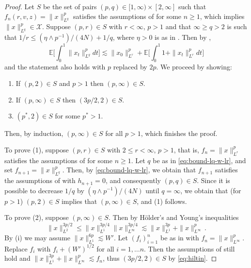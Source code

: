 \documentclass[final]{amsart}
\numberwithin{thm}{section}
\numberwithin{equation}{section}
\newcommand{\E}{\mathbb{E}}
\newcommand{\X}{\mathcal{X}}
\begin{document}
\begin{proof}

    Let $S$ be the set of pairs $(p,q) \in [1,\infty) \times [2,\infty]$ such that $f_n(r,v,z) = \|x\|_{L^q}^p$ satisfies the assumptions of  for some $n \geq 1$, which implies  $\|x\|_{L^q}^p \in \X$. 
    Suppose $(p,r) \in S$ with $r < \infty$, $p > 1$ and that $\infty \geq q > 2$ is such that $1/r \leq (\eta \wedge p^{-1})/(4N) + 1/q$, where $\eta>0$ is as in . Then by ,
     \begin{equation}\label{eq:bound-lq-w-lr}
         \E\Big[\int_0^1 \|x_t\|_{L^q}^pdt\Big] \lesssim \|x_0\|_{L^r}^p + \E\Big[\int_0^1 1+\|x_t\|_{L^r}^pdt\Big] 
     \end{equation}
and the statement also holds with $p$ replaced by $2p$.
We proceed by showing:
    \begin{enumerate}
        \item If $(p,2) \in S$ and $p > 1$ then $(p,\infty) \in S$.
        \item If $(p,\infty) \in S$ then $(3p/2,2) \in S$.
        \item $(p^*,2) \in S$ for some $p^* > 1$.
        
    \end{enumerate}
    Then, by induction, $(p,\infty) \in S$ for all $p > 1$, which finishes the proof. 

    To prove (1), suppose $(p,r) \in S$ with $2\leq r < \infty$, $p > 1$, that is, $f_n = \|x\|_{L^r}^p$ satisfies the assumptions of  for some $n \geq 1$. Let $q$ be as in \eqref{eq:bound-lq-w-lr}, and set $f_{n+1} = \|x\|_{L^q}^p$. Then, by \eqref{eq:bound-lq-w-lr}, we obtain that $f_{n+1}$ satisfies the assumptions of  with $h_{n+1} = 0$, and consequently $(p, q) \in S$. 
Since it is possible to decrease $1/q$ by $(\eta \wedge p^{-1})/(4N)$  until $q = \infty$, we obtain that (for $p > 1$) $(p,2) \in S$ implies that $(p,\infty) \in S$, and (1) follows.

    
    
    
    
    

    To prove (2), suppose $(p,\infty) \in S$. Then by H\" older's and Young's inequalities
     \begin{equation}\label{eq:hiltin}
     \|x\|_{L^2}^{3p/2} \leq \|x\|_{L^1}^{3p/4}\|x\|_{L^\infty}^{3p/4} \lesssim \|x\|_{L^1}^{3p} + \|x\|_{L^\infty}^{p}\,.
     \end{equation}
     By (i) we may assume $\|x\|_{L^1}^{6p} \lesssim W'$. Let $(f_i)_{i=1}^n$ be as in  with $f_n = \|x\|_{L^\infty}^p$. Replace $f_i$ with $f_i + (W')^{1/2}$ for all $i = 1, \ldots n$. Then the assumptions of  still hold and $\|x\|_{L^1}^{3p} + \|x\|_{L^\infty}^p \lesssim f_n$, thus $(3p/2,2) \in S$ by \eqref{eq:hiltin}.


\end{proof}
\end{document}
